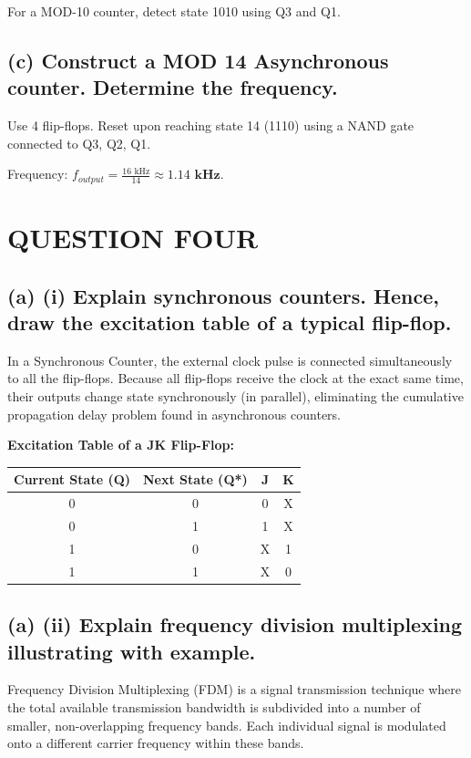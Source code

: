 \documentclass[11pt,a4paper]{article}
\begin{document}
For a MOD-10 counter, detect state 1010 using Q3 and Q1.

\subsection*{(c) Construct a MOD 14 Asynchronous counter. Determine the frequency.}
Use 4 flip-flops. Reset upon reaching state 14 (1110) using a NAND gate connected to Q3, Q2, Q1.

Frequency: $f_{output} = \frac{16 \text{ kHz}}{14} \approx \mathbf{1.14 \text{ kHz}}$.

\section*{QUESTION FOUR}

\subsection*{(a) (i) Explain synchronous counters. Hence, draw the excitation table of a typical flip-flop.}
In a Synchronous Counter, the external clock pulse is connected simultaneously to all the flip-flops. Because all flip-flops receive the clock at the exact same time, their outputs change state synchronously (in parallel), eliminating the cumulative propagation delay problem found in asynchronous counters.

\textbf{Excitation Table of a JK Flip-Flop:}

\begin{center}
\begin{tabular}{cccc}
\toprule
Current State (Q) & Next State (Q*) & J & K \\
\midrule
0 & 0 & 0 & X \\
0 & 1 & 1 & X \\
1 & 0 & X & 1 \\
1 & 1 & X & 0 \\
\bottomrule
\end{tabular}
\end{center}

\subsection*{(a) (ii) Explain frequency division multiplexing illustrating with example.}
Frequency Division Multiplexing (FDM) is a signal transmission technique where the total available transmission bandwidth is subdivided into a number of smaller, non-overlapping frequency bands. Each individual signal is modulated onto a different carrier frequency within these bands.
\end{document}

